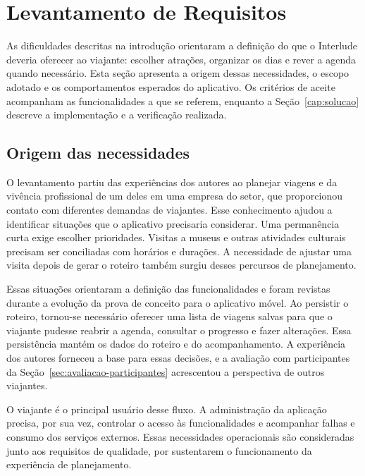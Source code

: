 \chapter[Levantamento de Requisitos]{Levantamento de Requisitos}
\label{cap:requisitos}

As dificuldades descritas na introdução orientaram a definição do que o Interlude deveria oferecer ao viajante: escolher atrações, organizar os dias e rever a agenda quando necessário. Esta seção apresenta a origem dessas necessidades, o escopo adotado e os comportamentos esperados do aplicativo. Os critérios de aceite acompanham as funcionalidades a que se referem, enquanto a Seção~\ref{cap:solucao} descreve a implementação e a verificação realizada.

\section{Origem das necessidades}
\label{sec:origem-requisitos}

O levantamento partiu das experiências dos autores ao planejar viagens e da vivência profissional de um deles em uma empresa do setor, que proporcionou contato com diferentes demandas de viajantes. Esse conhecimento ajudou a identificar situações que o aplicativo precisaria considerar. Uma permanência curta exige escolher prioridades. Visitas a museus e outras atividades culturais precisam ser conciliadas com horários e durações. A necessidade de ajustar uma visita depois de gerar o roteiro também surgiu desses percursos de planejamento.

Essas situações orientaram a definição das funcionalidades e foram revistas durante a evolução da prova de conceito para o aplicativo móvel. Ao persistir o roteiro, tornou-se necessário oferecer uma lista de viagens salvas para que o viajante pudesse reabrir a agenda, consultar o progresso e fazer alterações. Essa persistência mantém os dados do roteiro e do acompanhamento. A experiência dos autores forneceu a base para essas decisões, e a avaliação com participantes da Seção~\ref{sec:avaliacao-participantes} acrescentou a perspectiva de outros viajantes.

O viajante é o principal usuário desse fluxo. A administração da aplicação precisa, por sua vez, controlar o acesso às funcionalidades e acompanhar falhas e consumo dos serviços externos. Essas necessidades operacionais são consideradas junto aos requisitos de qualidade, por sustentarem o funcionamento da experiência de planejamento.

